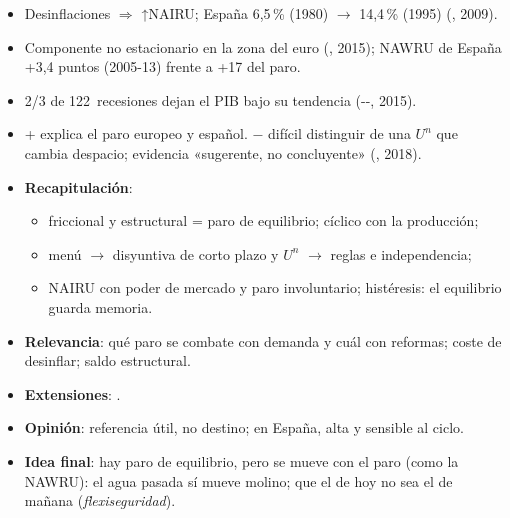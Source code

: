 \documentclass{article}
\begin{document}
\begin{columnas}
\begin{itemize}
\item Desinflaciones $\Rightarrow$ ↑NAIRU; España 6,5\,\% (1980) $\to$ 14,4\,\% (1995) (, 2009).
\item Componente no estacionario en la zona del euro (, 2015); NAWRU de España +3,4 puntos (2005-13) frente a +17 del paro.
\item 2/3 de 122~recesiones dejan el PIB bajo su tendencia (--, 2015).
\end{itemize}
\begin{itemize}
\item + explica el paro europeo y español. $-$ difícil distinguir de una $U^n$ que cambia despacio; evidencia «sugerente, no concluyente» (, 2018).
\end{itemize}

\begin{itemize}
\item \textbf{Recapitulación}:
  \begin{itemize}
  \item friccional y estructural = paro de equilibrio; cíclico con la producción;
  \item menú $\to$ disyuntiva de corto plazo y $U^n$ $\to$ reglas e independencia;
  \item NAIRU con poder de mercado y paro involuntario; histéresis: el equilibrio guarda memoria.
  \end{itemize}
\item \textbf{Relevancia}: qué paro se combate con demanda y cuál con reformas; coste de desinflar; saldo estructural.
\item \textbf{Extensiones}:      .
\item \textbf{Opinión}: referencia útil, no destino; en España, alta y sensible al ciclo.
\item \textbf{Idea final}: hay paro de equilibrio, pero se mueve con el paro (como la NAWRU): el agua pasada sí mueve molino; que el de hoy no sea el de mañana (\emph{flexiseguridad}).
\end{itemize}


\end{columnas}
\end{document}
